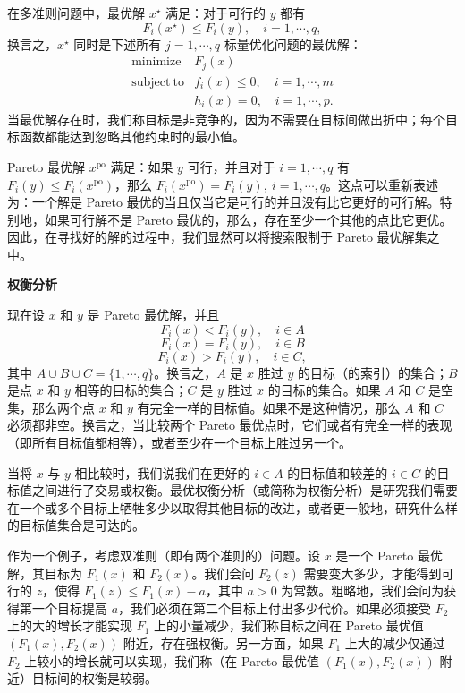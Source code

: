 \documentclass[UTF8,12pt,a4paper,fontset=fandol]{ctexart}
\begin{document}
在多准则问题中，最优解 $x^\star$ 满足：对于可行的 $y$ 都有
\[
F_i(x^\star)\leq F_i(y),\quad i=1,\cdots,q,
\]
换言之，$x^\star$ 同时是下述所有 $j=1,\cdots,q$ 标量优化问题的最优解：
\[
\begin{array}{ll}
\mathop{\mathrm{minimize}} & F_j(x)\\
\mathrm{subject\ to} & f_i(x)\leq 0,\quad i=1,\cdots,m\\
& h_i(x)=0,\quad i=1,\cdots,p.
\end{array}
\]
当最优解存在时，我们称目标是非竞争的，因为不需要在目标间做出折中；每个目标函数都能达到忽略其他约束时的最小值。

Pareto 最优解 $x^{\mathrm{po}}$ 满足：如果 $y$ 可行，并且对于 $i=1,\cdots,q$ 有 $F_i(y)\leq F_i(x^{\mathrm{po}})$，那么 $F_i(x^{\mathrm{po}})=F_i(y),\ i=1,\cdots,q$。这点可以重新表述为：一个解是 Pareto 最优的当且仅当它是可行的并且没有比它更好的可行解。特别地，如果可行解不是 Pareto 最优的，那么，存在至少一个其他的点比它更优。因此，在寻找好的解的过程中，我们显然可以将搜索限制于 Pareto 最优解集之中。

\noindent\textbf{权衡分析}

现在设 $x$ 和 $y$ 是 Pareto 最优解，并且
\[
F_i(x)<F_i(y),\quad i\in A
\]
\[
F_i(x)=F_i(y),\quad i\in B
\]
\[
F_i(x)>F_i(y),\quad i\in C,
\]
其中 $A\cup B\cup C=\{1,\cdots,q\}$。换言之，$A$ 是 $x$ 胜过 $y$ 的目标（的索引）的集合；$B$ 是点 $x$ 和 $y$ 相等的目标的集合；$C$ 是 $y$ 胜过 $x$ 的目标的集合。如果 $A$ 和 $C$ 是空集，那么两个点 $x$ 和 $y$ 有完全一样的目标值。如果不是这种情况，那么 $A$ 和 $C$ 必须都非空。换言之，当比较两个 Pareto 最优点时，它们或者有完全一样的表现（即所有目标值都相等），或者至少在一个目标上胜过另一个。

当将 $x$ 与 $y$ 相比较时，我们说我们在更好的 $i\in A$ 的目标值和较差的 $i\in C$ 的目标值之间进行了交易或权衡。最优权衡分析（或简称为权衡分析）是研究我们需要在一个或多个目标上牺牲多少以取得其他目标的改进，或者更一般地，研究什么样的目标值集合是可达的。

作为一个例子，考虑双准则（即有两个准则的）问题。设 $x$ 是一个 Pareto 最优解，其目标为 $F_1(x)$ 和 $F_2(x)$。我们会问 $F_2(z)$ 需要变大多少，才能得到可行的 $z$，使得 $F_1(z)\leq F_1(x)-a$，其中 $a>0$ 为常数。粗略地，我们会问为获得第一个目标提高 $a$，我们必须在第二个目标上付出多少代价。如果必须接受 $F_2$ 上的大的增长才能实现 $F_1$ 上的小量减少，我们称目标之间在 Pareto 最优值 $(F_1(x),F_2(x))$ 附近，存在强权衡。另一方面，如果 $F_1$ 上大的减少仅通过 $F_2$ 上较小的增长就可以实现，我们称（在 Pareto 最优值 $(F_1(x),F_2(x))$ 附近）目标间的权衡是较弱。
\end{document}
